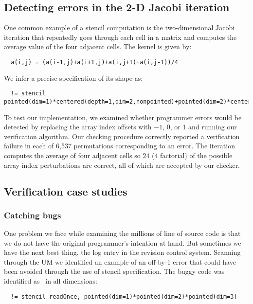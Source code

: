 \subsection{Detecting errors in the 2-D Jacobi iteration}
\label{sec:jacobi}
One common example of a stencil computation is the two-dimensional
Jacobi iteration that repeatedly goes through each cell in a matrix
and computes the average value of the four adjacent cells. The kernel
is given by:
\begin{verbatim}
  a(i,j) = (a(i-1,j)+a(i+1,j)+a(i,j+1)+a(i,j-1))/4
\end{verbatim}
We infer a precise specification of its shape as:
\begin{verbatim}
  != stencil pointed(dim=1)*centered(depth=1,dim=2,nonpointed)+pointed(dim=2)*centered(depth=1,dim=1,nonpointed)::a
\end{verbatim}
%
To test our implementation,
we examined whether programmer errors would be detected by replacing
the array index offsets with $-1$, $0$, or $1$ and running our
verification algorithm. Our checking procedure correctly reported a verification
failure in each of 6,537 permutations corresponding to an error.
The iteration computes the average of four adjacent
cells so $24$ ($4$ factorial) of the possible array index perturbations
are correct, all of which are accepted by our checker.

\subsection{Verification case studies}
\label{sec:case-studies}

\subsubsection{Catching bugs}

One problem we face while examining the millions of line of source
code is that we do not have the original programmer's intention at
hand. But sometimes we have the next best thing, the log entry in the
revision control system. Scanning through the UM we identified an
example of an off-by-1 error that could have been avoided through the
use of stencil specification. The buggy code was identified as
\pointed\ in all dimensions:

\begin{verbatim}
  != stencil readOnce, pointed(dim=1)*pointed(dim=2)*pointed(dim=3)
\end{verbatim}

